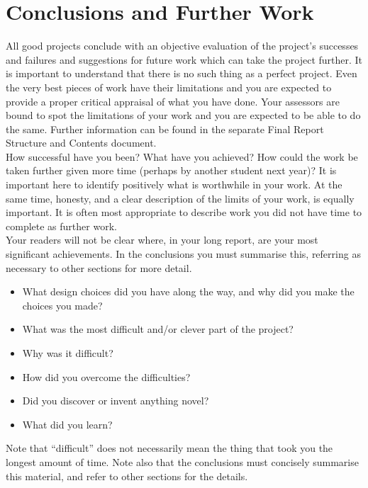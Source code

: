 \section{Conclusions and Further Work}
All good projects conclude with an objective evaluation of 
the project's successes and failures and
suggestions for future work which can take the
project further. It is important to understand that
there is no such thing as a perfect project. Even
the very best pieces of work have their
limitations and you are expected to provide a
proper critical appraisal of what you have done.
Your assessors are bound to spot the limitations
of your work and you are expected to be able to
do the same. Further information can be found in the separate
Final Report Structure and Contents document.\\ \newline \noindent How successful have you been? What have you
achieved? How could the work be taken further given
more time (perhaps by another student next year)? It
is important here to identify positively what is
worthwhile in your work. At the same time, honesty,
and a clear description of the limits of your work, is
equally important. It is often most appropriate to
describe work you did not have time to complete as
further work.\\ \newline \noindent Your readers will not be clear where, in your long
report, are your most significant achievements. In the
conclusions you must summarise this, referring as
necessary to other sections for more detail.
\begin{itemize}
    \item What design choices did you have along the
    way, and why did you make the choices you
    made?
    \item What was the most difficult and/or clever part
    of the project?
    \item Why was it difficult?
    \item How did you overcome the difficulties?
    \item Did you discover or invent anything novel?
    \item What did you learn?
\end{itemize}\noindent Note that “difficult” does not necessarily mean the
thing that took you the longest amount of time. Note
also that the conclusions must concisely summarise
this material, and refer to other sections for the
details.
